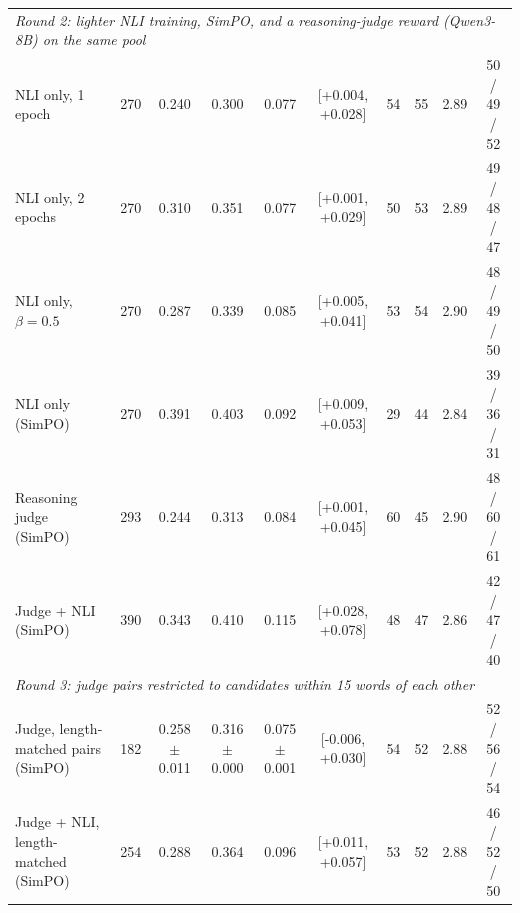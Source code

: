 \begin{table}[t]
{\begin{tabular}{lccccccccc}
\midrule
\multicolumn{10}{l}{\emph{Round 2: lighter NLI training, SimPO, and a reasoning-judge reward (Qwen3-8B) on the same pool}} \\
NLI only, 1 epoch & 270 & 0.240 & 0.300 & 0.077 & [+0.004, +0.028] & 54 & 55 & 2.89 & 50 / 49 / 52 \\
NLI only, 2 epochs & 270 & 0.310 & 0.351 & 0.077 & [+0.001, +0.029] & 50 & 53 & 2.89 & 49 / 48 / 47 \\
NLI only, $\beta{=}0.5$ & 270 & 0.287 & 0.339 & 0.085 & [+0.005, +0.041] & 53 & 54 & 2.90 & 48 / 49 / 50 \\
NLI only (SimPO) & 270 & 0.391 & 0.403 & 0.092 & [+0.009, +0.053] & 29 & 44 & 2.84 & 39 / 36 / 31 \\
Reasoning judge (SimPO) & 293 & 0.244 & 0.313 & 0.084 & [+0.001, +0.045] & 60 & 45 & 2.90 & 48 / 60 / 61 \\
Judge + NLI (SimPO) & 390 & 0.343 & 0.410 & 0.115 & [+0.028, +0.078] & 48 & 47 & 2.86 & 42 / 47 / 40 \\
\midrule
\multicolumn{10}{l}{\emph{Round 3: judge pairs restricted to candidates within 15 words of each other}} \\
Judge, length-matched pairs (SimPO) & 182 & 0.258$\pm$0.011 & 0.316$\pm$0.000 & 0.075$\pm$0.001 & [-0.006, +0.030] & 54 & 52 & 2.88 & 52 / 56 / 54 \\
Judge + NLI, length-matched (SimPO) & 254 & 0.288 & 0.364 & 0.096 & [+0.011, +0.057] & 53 & 52 & 2.88 & 46 / 52 / 50 \\
\bottomrule
\end{tabular}}
\end{table}

